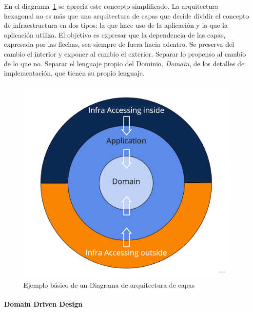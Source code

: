 En el diagrama~\cref{fig:layers} se aprecia este concepto simplificado.
La arquitectura hexagonal no es más que una arquitectura de capas que decide dividir el concepto de infraestructura en dos tipos: la que hace uso de la aplicación y la que la aplicación utiliza.
El objetivo es expresar que la dependencia de las capas, expresada por las flechas, sea siempre de fuera hacia adentro.
Se preserva del cambio el interior y exponer al cambio el exterior.
Separar lo propenso al cambio de lo que no.
Separar el lenguaje propio del Dominio, \textit{Domain}, de los detalles de implementación, que tienen su propio lenguaje.

\begin{figure}[H]
    \centering
    \includegraphics[height=0.22\textheight]{./part/Proyecto_ejecutivo/memoria_descriptiva/infoPreviaAntecedentes/img/PFM - Layer}
    \caption{Ejemplo básico de un Diagrama de arquitectura de capas}\label{fig:layers}
\end{figure}

\paragraph{Domain Driven Design}


